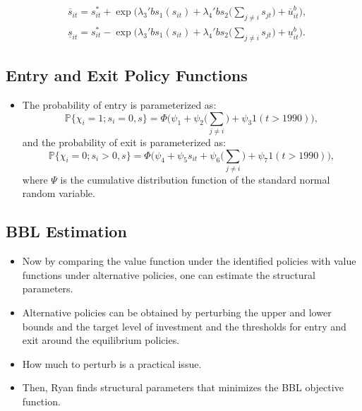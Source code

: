 \documentclass[
]{book}
\providecommand{\tightlist}{%
  \setlength{\itemsep}{0pt}\setlength{\parskip}{0pt}}
\begin{document}
\begin{equation}
\begin{split}
&\overline{s}_{it} = s_{it}^* + \exp\Bigg(\lambda_3' bs_1(s_{it}) + \lambda_4' bs_2\Bigg(\sum_{j \neq i} s_{jt} \Bigg) + \overline{u}_{it}^b \Bigg),\\
&\underline{s}_{it} = s_{it}^* - \exp\Bigg(\lambda_3' bs_1(s_{it}) + \lambda_4' bs_2\Bigg(\sum_{j \neq i} s_{jt} \Bigg) + \underline{u}_{it}^b \Bigg).
\end{split}
\end{equation}

\hypertarget{entry-and-exit-policy-functions}{%
\subsection{Entry and Exit Policy Functions}\label{entry-and-exit-policy-functions}}

\begin{itemize}
\tightlist
\item
  The probability of entry is parameterized as:
  \begin{equation}
  \mathbb{P}\{\chi_i = 1; s_i = 0, s\} = \Phi\Bigg(\psi_1 + \psi_2\Bigg(\sum_{j \neq i}\Bigg) + \psi_3 1(t > 1990) \Bigg),
  \end{equation}
  and the probability of exit is parameterized as:
  \begin{equation}
  \mathbb{P}\{\chi_i = 0; s_i > 0, s\} = \Phi\Bigg(\psi_4 + \psi_5 s_{it} + \psi_6 \Bigg(\sum_{j \neq i}\Bigg) + \psi_7 1(t > 1990) \Bigg),
  \end{equation}
  where \(\Psi\) is the cumulative distribution function of the standard normal random variable.
\end{itemize}

\hypertarget{bbl-estimation}{%
\subsection{BBL Estimation}\label{bbl-estimation}}

\begin{itemize}
\tightlist
\item
  Now by comparing the value function under the identified policies with value functions under alternative policies, one can estimate the structural parameters.
\item
  Alternative policies can be obtained by perturbing the upper and lower bounds and the target level of investment and the thresholds for entry and exit around the equilibrium policies.
\item
  How much to perturb is a practical issue.
\item
  Then, Ryan finds structural parameters that minimizes the BBL objective function.
\end{itemize}
\end{document}
